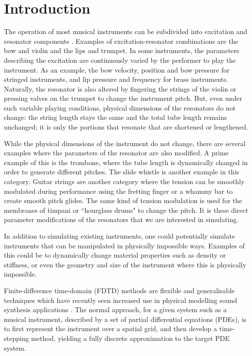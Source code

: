 \section{Introduction}
The operation of most musical instruments can be subdivided into excitation and resonator components \cite{Borin1989}. Examples of excitation-resonator combinations are the bow and violin and the lips and trumpet. In some instruments, the parameters describing the excitation  are continuously varied by the performer to play the instrument. As an example, the bow velocity, position and bow pressure for stringed instruments, and lip pressure and frequency for brass instruments. Naturally, the resonator is also altered by fingering the strings of the violin or pressing valves on the trumpet to change the instrument pitch. But, even under such variable playing conditions, physical dimensions of the resonators do not change: the string length stays the same and the total tube length remains unchanged; it is only the portions that resonate that are shortened or lengthened.

While the physical dimensions of the instrument do not change, there are several examples where the parameters of the resonator are also modified. A prime example of this is the trombone, where the tube length is dynamically changed in order to generate different pitches. The slide whistle is another example in this category. Guitar strings are another category where the tension can be smoothly modulated during performance using the fretting finger or a whammy bar  %
to create smooth pitch glides.  The same kind of tension modulation is used for the membranes of timpani or ``hourglass drums" to change the pitch. 
It is these direct parameter modifications of the resonators that we are interested in simulating. 

In addition to simulating existing instruments, one could potentially simulate instruments that can be manipulated in physically impossible ways. Examples of this could be to dynamically change material properties such as density or stiffness, or even the geometry and size of the instrument where this is physically impossible.

Finite-difference time-domain (FDTD) methods are flexible and generalisable techniques which have recently seen increased use in physical modelling sound synthesis applications \cite{bilbao2009}. The normal approach, for a given system such as a musical instrument, described by a set of partial differential equations (PDEs), is to first represent the instrument over a spatial grid, and then develop a time-stepping method, yielding a fully discrete approximation to the target PDE system. 

